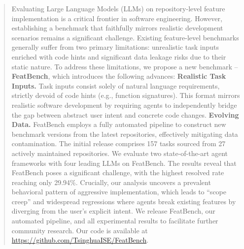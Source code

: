 \begin{abstract}
Evaluating Large Language Models (LLMs) on repository-level feature implementation is a critical frontier in software engineering. However, establishing a benchmark that faithfully mirrors realistic development scenarios remains a significant challenge. Existing feature-level benchmarks generally suffer from two primary limitations: unrealistic task inputs enriched with code hints and significant data leakage risks due to their static nature. To address these limitations, we propose a new benchmark -- \textbf{FeatBench}, which introduces the following advances:  \textbf{Realistic Task Inputs.} Task inputs consist solely of natural language requirements, strictly devoid of code hints (e.g., function signatures). This format mirrors realistic software development by requiring agents to independently bridge the gap between abstract user intent and concrete code changes.  \textbf{Evolving Data.} FeatBench employs a fully automated pipeline to construct new benchmark versions from the latest repositories, effectively mitigating data contamination. The initial release comprises 157 tasks sourced from 27 actively maintained repositories. We evaluate two state-of-the-art agent frameworks with four leading LLMs on FeatBench. The results reveal that FeatBench poses a significant challenge, with the highest resolved rate reaching only 29.94\%. Crucially, our analysis uncovers a prevalent behavioral pattern of aggressive implementation, which leads to ``scope creep'' and widespread regressions where agents break existing features by diverging from the user's explicit intent. We release FeatBench, our automated pipeline, and all experimental results to facilitate further community research. Our code is available at \url{https://github.com/TsinghuaISE/FeatBench}.
\end{abstract}